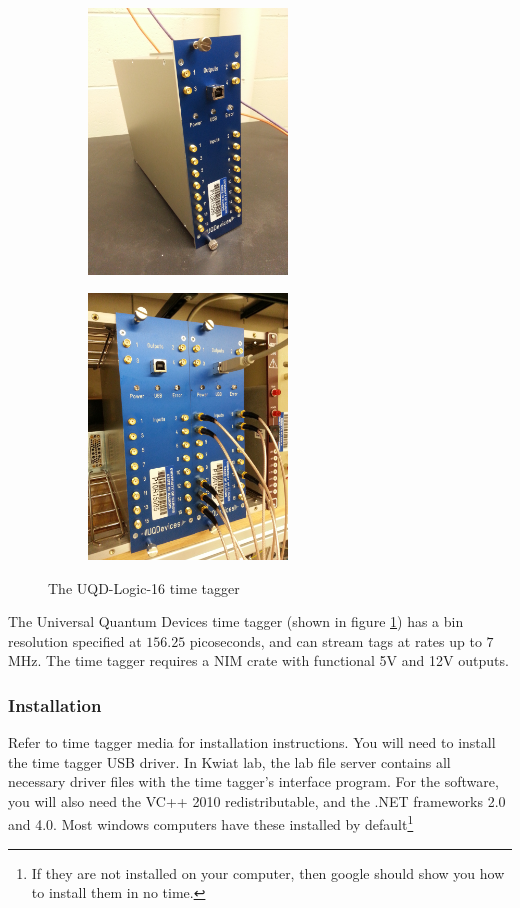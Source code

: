 \documentclass[10pt]{article}
\begin{document}
\begin{figure}
\centering
\begin{subfigure}[b]{0.4\textwidth}
\includegraphics[width=200px,angle=-90]{UQD1.jpg}
\end{subfigure}
\qquad
\begin{subfigure}[b]{0.4\textwidth}
\includegraphics[width=200px,angle=-90]{UQD2.jpg}
\end{subfigure}
\caption{The UQD-Logic-16 time tagger}
\label{fig:uqd_pic}
\end{figure}

The Universal Quantum Devices time tagger (shown in figure \ref{fig:uqd_pic}) has a bin 
resolution specified at $156.25$ picoseconds, and can stream tags at rates up to $7$ MHz.
The time tagger requires a NIM crate with functional 5V and 12V outputs.
\subsubsection{Installation}
Refer to time tagger media for installation instructions. 
You will need to install the time tagger USB driver. In Kwiat lab, the lab file server contains all necessary driver files
with the time tagger's interface program.
For the software, you will also need the VC++ 2010 redistributable, and the .NET frameworks 2.0 and 4.0.
Most windows computers have these installed by default\footnote{If they are not installed on your computer, then
google should show you how to install them in no time.}
\end{document}
